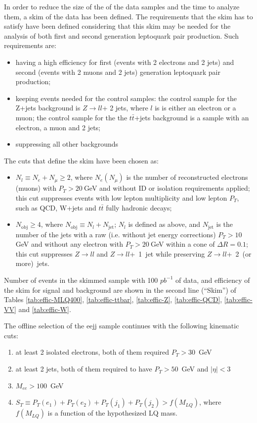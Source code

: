 In order to reduce the size of the of the data samples and the time to analyze them, a skim of the 
data has been defined.
The requirements that the skim has to satisfy have been defined considering that this skim may be needed
for the analysis of both first and second generation leptoquark pair production. Such requirements are:
\begin{itemize}
\item having a high efficiency for first (events with 2 electrons and 2 jets) and second (events with 
2 muons and 2 jets) generation leptoquark pair production; 
\item keeping events needed for the control samples: the control sample for the Z+jets background is $Z\rightarrow l l$+ 2 jets,
where $l$ is is either an electron or a muon; the control sample for the the $t\bar{t}$+jets background is a sample 
with an electron, a muon and 2 jets;
\item suppressing all other backgrounds
\end{itemize}
The cuts that define the skim have been chosen as:
\begin{itemize}
\item $N_l \equiv N_e + N_{\mu} \ge 2$, where $N_e (N_{\mu})$ is the number of reconstructed electrons (muons)
with $P_T>20~$GeV and without ID or isolation requirements applied; this cut suppresses events with low 
lepton multiplicity and low lepton $P_T$, such as QCD, W+jets and $t\bar{t}$ fully hadronic decays;
\item $N_{\mathrm{obj}} \ge 4$, where $N_{\mathrm{obj}} \equiv N_l + N_{\mathrm{jet}}$; $N_l$ is defined as above, and
$N_{\mathrm{jet}}$ is the number of the jets with a raw (i.e. without jet energy corrections) $P_T > 10~$GeV and without 
any electron with $P_T > 20~$GeV within a cone of $\Delta R=0.1$; this cut suppresses $Z \rightarrow ll$ and 
$Z \rightarrow ll$+~1~jet while preserving $Z \rightarrow ll$+~2~(or more)~jets.
\end{itemize}

Number of events in the skimmed sample with 100 $pb^{-1}$ of data, and 
efficiency of the skim for signal and background are shown in the second line (``Skim'') 
of Tables
\ref{tab:effic-MLQ400}, 
\ref{tab:effic-ttbar}, 
\ref{tab:effic-Z}, 
\ref{tab:effic-QCD},
\ref{tab:effic-VV} and
\ref{tab:effic-W}.

The offline selection of the eejj sample continues with the following kinematic cuts:
%
\begin{enumerate}
\item at least 2 isolated electrons, both of them required $P_T>30$~GeV 
\item at least 2 jets, both of them required to have $P_T>50$~GeV and $|\eta|<3$
\item $M_{ee}>100$~GeV
\item $S_T\equiv P_T(e_1)+P_T(e_2)+P_T(j_1)+P_T(j_2)>f(M_{LQ})$, where $f(M_{LQ})$ is a function 
of the hypothesized LQ mass.
\end{enumerate}
%

